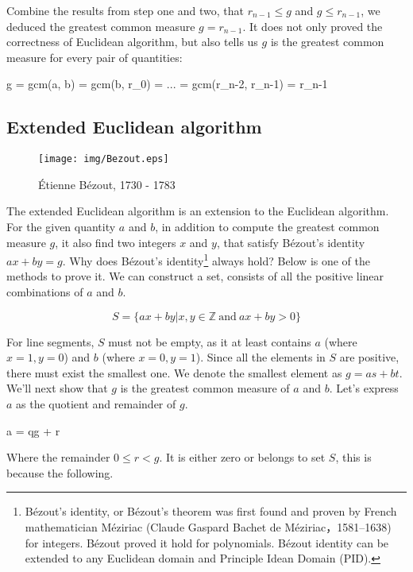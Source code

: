 \documentclass{article}
\begin{document}
Combine the results from step one and two, that $r_{n-1} \leq g$ and $g \leq r_{n-1}$, we deduced the greatest common measure $g = r_{n-1}$. It does not only proved the correctness of Euclidean algorithm, but also tells us $g$ is the greatest common measure for every pair of quantities:

\be
g = gcm(a, b) = gcm(b, r_0) = ... = gcm(r_{n-2}, r_{n-1}) = r_{n-1}
\label{eq:recursive-gcm}
\ee

\subsection{Extended Euclidean algorithm}

\begin{wrapfigure}{R}{0.4\textwidth}
 \centering
 \texttt{[image: img/Bezout.eps]}
 \captionsetup{labelformat=empty}
 \caption{Étienne Bézout, 1730 - 1783}
 \label{fig:Bezout}
\end{wrapfigure}

The extended Euclidean algorithm is an extension to the Euclidean algorithm. For the given quantity $a$ and $b$, in addition to compute the greatest common measure $g$, it also find two integers $x$ and $y$, that satisfy Bézout's identity $ax + by = g$. Why does Bézout's identity\footnote{Bézout's identity, or Bézout's theorem was first found and proven by French mathematician Méziriac (Claude Gaspard Bachet de Méziriac，1581–1638) for integers. Bézout proved it hold for polynomials. Bézout identity can be extended to any Euclidean domain and Principle Idean Domain (PID).} always hold? Below is one of the methods to prove it. We can construct a set, consists of all the positive linear combinations of $a$ and $b$.

\[
S = \{ ax + by | x, y \in \mathbb{Z}\ \text{and} \ ax + by > 0\}
\]

For line segments, $S$ must not be empty, as it at least contains $a$ (where $x = 1, y = 0$) and $b$ (where $x = 0, y = 1$). Since all the elements in $S$ are positive, there must exist the smallest one. We denote the smallest element as $g = as + bt$. We'll next show that $g$ is the greatest common measure of $a$ and $b$. Let's express $a$ as the quotient and remainder of $g$.

\be
a = qg + r
\label{eq:Euclidean-division}
\ee

Where the remainder $0 \leq r < g$. It is either zero or belongs to set $S$, this is because the following.
\end{document}
